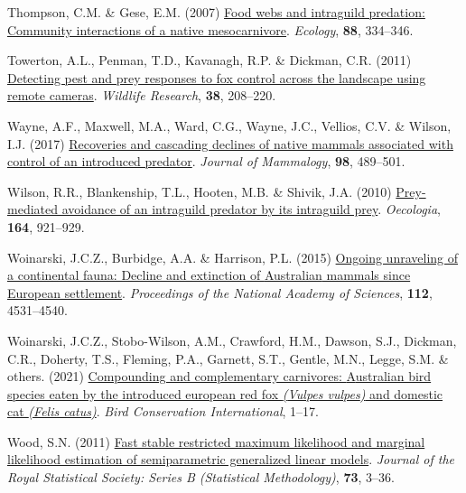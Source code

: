 \documentclass[preprint, 3p, authoryear]{elsarticle} %
\newlength{\cslhangindent}
\newlength{\cslentryspacingunit} %
\newenvironment{CSLReferences}[2] %
 {%
  \setlength{\parindent}{0pt}
  \ifodd #1
  \let\oldpar\par
  \def\par{\hangindent=\cslhangindent\oldpar}
  \fi
  \setlength{\parskip}{#2\cslentryspacingunit}
 }%
 {}
\begin{document}
\begin{CSLReferences}{1}{0}
\leavevmode{}%
Thompson, C.M. \& Gese, E.M. (2007) \href{https://doi.org/10.1890/0012-9658(2007)88\%5B334:FWAIPC\%5D2.0.CO;2}{Food webs and intraguild predation: Community interactions of a native mesocarnivore}. \emph{Ecology}, \textbf{88}, 334--346.

\leavevmode{}%
Towerton, A.L., Penman, T.D., Kavanagh, R.P. \& Dickman, C.R. (2011) \href{https://doi.org/10.1071/WR10213}{Detecting pest and prey responses to fox control across the landscape using remote cameras}. \emph{Wildlife Research}, \textbf{38}, 208--220.

\leavevmode{}%
Wayne, A.F., Maxwell, M.A., Ward, C.G., Wayne, J.C., Vellios, C.V. \& Wilson, I.J. (2017) \href{https://doi.org/10.1093/jmammal/gyw237}{{Recoveries and cascading declines of native mammals associated with control of an introduced predator}}. \emph{Journal of Mammalogy}, \textbf{98}, 489--501.

\leavevmode{}%
Wilson, R.R., Blankenship, T.L., Hooten, M.B. \& Shivik, J.A. (2010) \href{https://doi.org/10.1007/s00442-010-1797-8}{Prey-mediated avoidance of an intraguild predator by its intraguild prey}. \emph{Oecologia}, \textbf{164}, 921--929.

\leavevmode{}%
Woinarski, J.C.Z., Burbidge, A.A. \& Harrison, P.L. (2015) \href{https://doi.org/10.1073/pnas.1417301112}{Ongoing unraveling of a continental fauna: Decline and extinction of {{A}ustralian} mammals since {European} settlement}. \emph{Proceedings of the National Academy of Sciences}, \textbf{112}, 4531--4540.

\leavevmode{}%
Woinarski, J.C.Z., Stobo-Wilson, A.M., Crawford, H.M., Dawson, S.J., Dickman, C.R., Doherty, T.S., Fleming, P.A., Garnett, S.T., Gentle, M.N., Legge, S.M. \& others. (2021) \href{https://doi.org/10.1017/S0959270921000460}{Compounding and complementary carnivores: {A}ustralian bird species eaten by the introduced european red fox \emph{({Vulpes vulpes})} and domestic cat \emph{({Felis catus})}}. \emph{Bird Conservation International}, 1--17.

\leavevmode{}%
Wood, S.N. (2011) \href{\%20https://doi.org/10.1111/j.1467-9868.2010.00749.x}{Fast stable restricted maximum likelihood and marginal likelihood estimation of semiparametric generalized linear models}. \emph{Journal of the Royal Statistical Society: Series B (Statistical Methodology)}, \textbf{73}, 3--36.


\end{CSLReferences}
\end{document}
